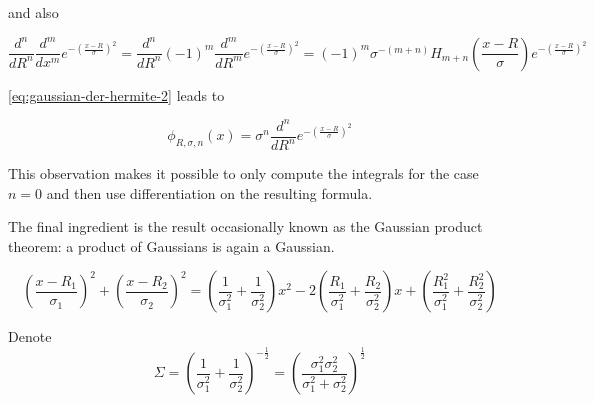 \documentclass{article}
\begin{document}
\begin{appendices}
and also

\begin{equation} \label{eq:gaussian-der-hermite-3}
\frac{d^n}{dR^n}\frac{d^m}{dx^m}e^{-\left(\frac{x-R}{\sigma}\right)^2} = \frac{d^n}{dR^n}(-1)^m\frac{d^m}{dR^m}e^{-\left(\frac{x-R}{\sigma}\right)^2} =
(-1)^m \sigma^{-(m+n)} H_{m+n} \left(\frac{x-R}{\sigma}\right) e^{-\left(\frac{x-R}{\sigma}\right)^2}
\end{equation}

\eqref{eq:gaussian-der-hermite-2} leads to

\begin{equation} \label{eq:hgto-param}
\phi_{R,\sigma,n}(x) = \sigma^n \frac{d^n}{dR^n}e^{-\left(\frac{x-R}{\sigma}\right)^2}
\end{equation}

This observation makes it possible to only compute the integrals for the case \begin{math}n=0\end{math} and then use differentiation on the resulting formula.

The final ingredient is the result occasionally known as the Gaussian product theorem: a product of Gaussians is again a Gaussian. 

\begin{equation} \label{eq:gaussian-prod-1}
\left(\frac{x-R_1}{\sigma_1}\right)^2 + \left(\frac{x-R_2}{\sigma_2}\right)^2 = \left(\frac{1}{\sigma_1^2}+\frac{1}{\sigma_2^2}\right)x^2
- 2 \left(\frac{R_1}{\sigma_1^2}+\frac{R_2}{\sigma_2^2}\right)x + \left(\frac{R_1^2}{\sigma_1^2}+\frac{R_2^2}{\sigma_2^2}\right)
\end{equation}

Denote
\begin{equation}
\Sigma = \left(\frac{1}{\sigma_1^2}+\frac{1}{\sigma_2^2}\right)^{-\frac{1}{2}} = \left(\frac{\sigma_1^2\sigma_2^2}{\sigma_1^2+\sigma_2^2}\right)^\frac{1}{2}
\end{equation}


\end{appendices}
\end{document}

